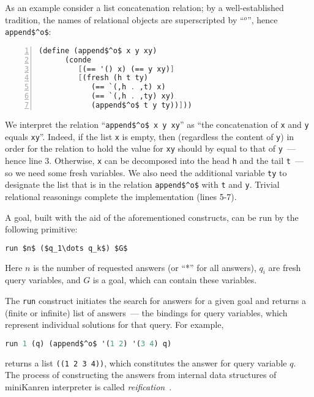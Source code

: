 As an example consider a list concatenation relation; by a well-established tradition, the names 
of relational objects are superscripted by ``$^o$'', hence \lstinline{append$^o$}: 

\begin{lstlisting}[mathescape=true,language=scheme,numbers=left,numberstyle=\small,stepnumber=1,numbersep=-5pt]
   (define (append$^o$ x y xy) 
      (conde 
         [(== '() x) (== y xy)]
         [(fresh (h t ty)
            (== `(,h . ,t) x)
            (== `(,h . ,ty) xy)
            (append$^o$ t y ty))]))
\end{lstlisting}

We interpret the relation ``\lstinline{append$^o$ x y xy}'' as ``the concatenation of \lstinline{x} and \lstinline{y} 
equals \lstinline{xy}''. Indeed, if the list \lstinline{x} is empty, then (regardless the content of \lstinline{y}) in order for the relation to hold 
the value for \lstinline{xy} should by equal to that of \lstinline{y}~--- hence line 3. Otherwise, \lstinline{x} can be decomposed into the head 
\lstinline{h} and the tail \lstinline{t}~--- so we need some fresh variables. We also need the additional variable \lstinline{ty} to designate the list 
that is in the relation \lstinline{append$^o$} with \lstinline{t} and \lstinline{y}. Trivial relational reasonings complete the implementation (lines 5-7).

A goal, built with the aid of the aforementioned constructs, can be run by the following primitive:

\begin{lstlisting}[mathescape=true,language=scheme]
   run $n$ ($q_1\dots q_k$) $G$
\end{lstlisting}

Here $n$ is the number of requested answers (or ``*'' for all answers), $q_i$ are fresh query variables, and $G$ is a goal, which can
contain these variables. 

The \lstinline{run} construct initiates the search for answers for a given goal and returns a (finite or infinite) list 
of answers~--- the bindings for query variables, which represent individual solutions for that query. For example,

\begin{lstlisting}[mathescape=true,language=scheme]
   run 1 (q) (append$^o$ '(1 2) '(3 4) q) 
\end{lstlisting}

\noindent returns a list \lstinline{((1 2 3 4))}, which constitutes the answer for query variable $q$. The process of constructing
the answers from internal data structures of miniKanren interpreter is called \emph{reification}~\cite{WillThesis}. 

